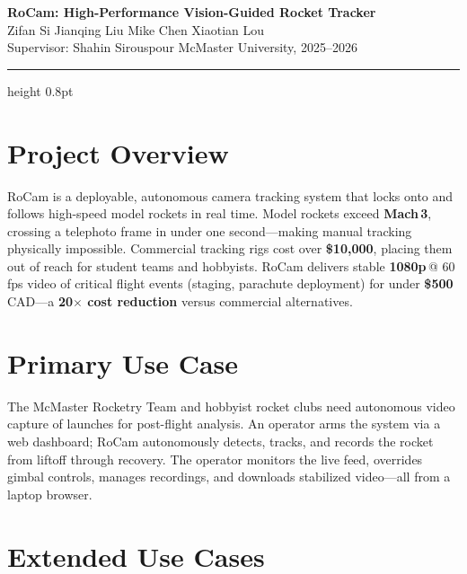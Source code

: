 \documentclass[10pt, letterpaper]{article}
\newcommand{\metric}[2]{\textbf{#1}\,#2}
\begin{document}
\begin{center}
    {\LARGE\bfseries\color{accent} RoCam: High-Performance Vision-Guided Rocket Tracker}\\[4pt]
    {\normalsize Zifan Si \;\textbullet\; Jianqing Liu \;\textbullet\; Mike Chen \;\textbullet\; Xiaotian Lou}\\[1pt]
    {\small\color{medgray} Supervisor: Shahin Sirouspour \;\textbar\; McMaster University, 2025--2026}
\end{center}

\vspace{-2pt}
{\color{ruleline}\hrule height 0.8pt}
\vspace{3pt}

\section*{Project Overview}

RoCam is a deployable, autonomous camera tracking system that locks onto and follows high-speed model rockets in real time. Model rockets exceed \textbf{Mach\,3}, crossing a telephoto frame in under one second---making manual tracking physically impossible. Commercial tracking rigs cost over \textbf{\$10{,}000}, placing them out of reach for student teams and hobbyists. RoCam delivers stable \metric{1080p}{@ 60\,fps} video of critical flight events (staging, parachute deployment) for under \metric{\$500}{CAD}---a \textbf{20$\times$ cost reduction} versus commercial alternatives.

\section*{Primary Use Case}

The McMaster Rocketry Team and hobbyist rocket clubs need autonomous video capture of launches for post-flight analysis. An operator arms the system via a web dashboard; RoCam autonomously detects, tracks, and records the rocket from liftoff through recovery. The operator monitors the live feed, overrides gimbal controls, manages recordings, and downloads stabilized video---all from a laptop browser.

\section*{Extended Use Cases}
\end{document}
